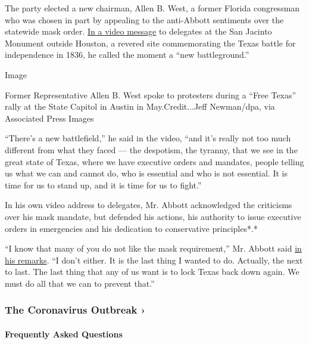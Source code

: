 The party elected a new chairman, Allen B. West, a former Florida
congressman who was chosen in part by appealing to the anti-Abbott
sentiments over the statewide mask order.
\href{https://youtu.be/cqlkCX1VWUc}{In a video message} to delegates at
the San Jacinto Monument outside Houston, a revered site commemorating
the Texas battle for independence in 1836, he called the moment a ``new
battleground.''

Image

Former Representative Allen B. West spoke to protesters during a ``Free
Texas'' rally at the State Capitol in Austin in May.Credit...Jeff
Newman/dpa, via Associated Press Images

``There's a new battlefield,'' he said in the video, ``and it's really
not too much different from what they faced --- the despotism, the
tyranny, that we see in the great state of Texas, where we have
executive orders and mandates, people telling us what we can and cannot
do, who is essential and who is not essential. It is time for us to
stand up, and it is time for us to fight.''

In his own video address to delegates, Mr. Abbott acknowledged the
criticisms over his mask mandate, but defended his actions, his
authority to issue executive orders in emergencies and his dedication to
conservative principles*.*

``I know that many of you do not like the mask requirement,'' Mr. Abbott
said
\href{https://www.youtube.com/watch?v=0DM1SCP8vwU\&feature=youtu.be}{in
his remarks}. ``I don't either. It is the last thing I wanted to do.
Actually, the next to last. The last thing that any of us want is to
lock Texas back down again. We must do all that we can to prevent
that.''

\href{https://www.nytimes.com/news-event/coronavirus?action=click\&pgtype=Article\&state=default\&region=MAIN_CONTENT_3\&context=storylines_faq}{}

\hypertarget{the-coronavirus-outbreak-}{%
\subsubsection{The Coronavirus Outbreak
›}\label{the-coronavirus-outbreak-}}

\hypertarget{frequently-asked-questions}{%
\paragraph{Frequently Asked
Questions}\label{frequently-asked-questions}}

